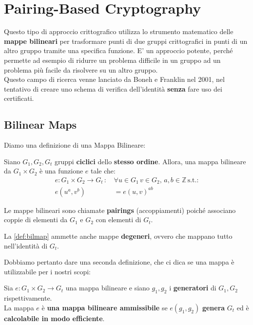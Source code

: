 \chapter{Pairing-Based Cryptography}
Questo tipo di approccio crittografico utilizza lo strumento matematico delle \textbf{mappe bilineari} per trasformare punti di due gruppi crittografici in punti di un altro gruppo tramite una specifica funzione. E' un approccio potente, perché permette ad esempio di ridurre un problema difficile in un gruppo ad un problema più facile da risolvere su un altro gruppo.\\
Questo campo di ricerca venne lanciato da Boneh e Franklin nel 2001, nel tentativo di creare uno schema di verifica dell'identità \textbf{senza} fare uso dei certificati.
\section{Bilinear Maps}
Diamo una definizione di una Mappa Bilineare:
\begin{definition}\label{def:bilmap}
Siano $G_1,G_2,G_t$ gruppi \textbf{ciclici} dello \textbf{stesso ordine}. Allora, una mappa bilineare da $G_1\times G_2$ è una funzione $e$ tale che:
\begin{equation}
    \begin{aligned}
    e:G_1\times G_2\longrightarrow G_t\,:\, &\forall u\in{G_1}\, v\in{G_2},\,a,b\in{\mathbb{Z}}\,\text{s.t.:}\\
    e(u^a,v^b)&=e(u,v)^{ab}
    \end{aligned}
\end{equation}
\end{definition}
\begin{remark}
Le mappe bilineari sono chiamate \textbf{pairings} (accoppiamenti) poiché associano coppie di elementi da $G_1$ e $G_2$ con elementi di $G_t$.
\end{remark}
\begin{remark}La \cref{def:bilmap} ammette anche mappe \textbf{degeneri}, ovvero che mappano tutto nell'identità di $G_t$.
\end{remark}
Dobbiamo pertanto dare una seconda definizione, che ci dica se una mappa è utilizzabile per i nostri scopi:
\begin{definition}\label{def:admbil}
Sia $e:G_1\times G_2\longrightarrow G_t$ una mappa bilineare e siano $g_1,g_2$ i \textbf{generatori} di $G_1,G_2$ rispettivamente.\\
La mappa $e$ è \textbf{una mappa bilineare ammissibile} se $e(g_1,g_2)$ \textbf{genera} $G_t$ ed è \textbf{calcolabile in modo efficiente}.
\end{definition}
